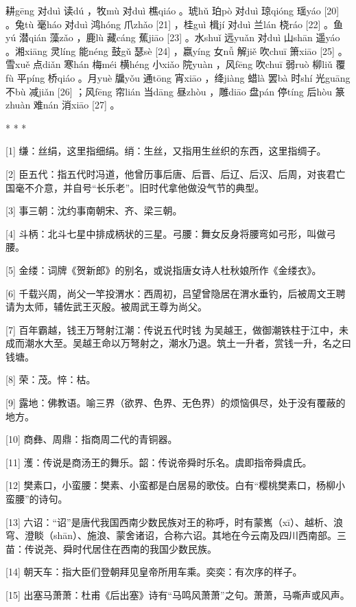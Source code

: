 \documentclass[12pt,UTF8]{ctexbook}
\begin{document}
耕gēng 对duì 读dú ，牧mù 对duì 樵qiáo 。琥hǔ 珀pò 对duì 琼qióng 瑶yáo [20] 。兔tù 毫háo 对duì 鸿hóng 爪zhǎo [21] ，桂guì 楫jí 对duì 兰lán 桡ráo [22] 。鱼yú 潜qián 藻zǎo ，鹿lù 藏cáng 蕉jiāo [23] 。水shuǐ 远yuǎn 对duì 山shān 遥yáo 。湘xiāng 灵líng 能néng 鼓gǔ 瑟sè [24] ，嬴yíng 女nǚ 解jiě 吹chuī 箫xiāo [25] 。雪xuě 点diǎn 寒hán 梅méi 横héng 小xiǎo 院yuàn ，风fēng 吹chuī 弱ruò 柳liǔ 覆fù 平píng 桥qiáo 。月yuè 牖yǒu 通tōng 宵xiāo ，绛jiàng 蜡là 罢bà 时shí 光guāng 不bù 减jiǎn [26] ；风fēng 帘lián 当dāng 昼zhòu ，雕diāo 盘pán 停tíng 后hòu 篆zhuàn 难nán 消xiāo [27] 。



* * *



[1] 缣：丝绢，这里指细绢。绡：生丝，又指用生丝织的东西，这里指绸子。

[2] 臣五代：指五代时冯道，他曾历事后唐、后晋、后辽、后汉、后周，对丧君亡国毫不介意，并自号“长乐老”。旧时代拿他做没气节的典型。

[3] 事三朝：沈约事南朝宋、齐、梁三朝。

[4] 斗柄：北斗七星中排成柄状的三星。弓腰：舞女反身将腰弯如弓形，叫做弓腰。

[5] 金缕：词牌《贺新郎》的别名，或说指唐女诗人杜秋娘所作《金缕衣》。

[6] 千载兴周，尚父一竿投渭水：西周初，吕望曾隐居在渭水垂钓，后被周文王聘请为太师，辅佐武王灭殷。被周武王尊为尚父。

[7] 百年霸越，钱王万弩射江潮：传说五代时钱 为吴越王，做御潮铁柱于江中，未成而潮水大至。吴越王命以万弩射之，潮水乃退。筑土一升者，赏钱一升，名之曰钱塘。

[8] 荣：茂。悴：枯。

[9] 露地：佛教语。喻三界（欲界、色界、无色界）的烦恼俱尽，处于没有覆蔽的地方。

[10] 商彝、周鼎：指商周二代的青铜器。

[11] 濩：传说是商汤王的舞乐。韶：传说帝舜时乐名。虞即指帝舜虞氏。

[12] 樊素口，小蛮腰：樊素、小蛮都是白居易的歌伎。白有“樱桃樊素口，杨柳小蛮腰”的诗句。

[13] 六诏：“诏”是唐代我国西南少数民族对王的称呼，时有蒙嶲（xī）、越析、浪穹、澄睒（shān）、施浪、蒙舍诸诏，合称六诏。其地在今云南及四川西南部。三苗：传说尧、舜时代居住在西南的我国少数民族。

[14] 朝天车：指大臣们登朝拜见皇帝所用车乘。奕奕：有次序的样子。

[15] 出塞马萧萧：杜甫《后出塞》诗有“马鸣风萧萧”之句。萧萧，马嘶声或风声。
\end{document}
